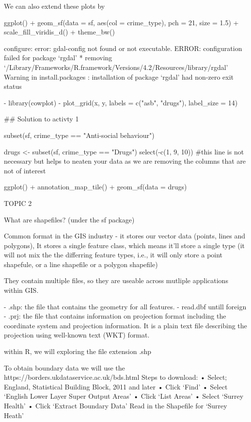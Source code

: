 \documentclass[12pt]{article}
\begin{document}
We can also extend these plots by 

ggplot() + 
  geom_sf(data = sf, aes(col = crime_type), pch = 21, size = 1.5) +
  scale_fill_viridis_d() + 
  theme_bw()


configure: error: gdal-config not found or not executable.
ERROR: configuration failed for package ‘rgdal’
* removing ‘/Library/Frameworks/R.framework/Versions/4.2/Resources/library/rgdal’
Warning in install.packages :
  installation of package ‘rgdal’ had non-zero exit status



- library(cowplot)
- plot_grid(x, y, labels = c("asb", "drugs"), label_size = 14)




## Solution to activty 1

subset(sf, crime_type == "Anti-social behaviour") 

drugs <- subset(sf, crime_type == "Drugs") %
  select(-c(1, 9, 10))      #this line is not necessary but helps to neaten your data as we are removing the columns that are not of interest

ggplot() +
  annotation_map_tile() +
  geom_sf(data = drugs) 





TOPIC 2 

  What are shapefiles?  (under the sf package)

Common format in the GIS industry - it stores our vector data (points, lines and polygons), It stores a single feature class, which means it'll store a single type (it will not mix the the differring feature types, i.e., it will only store a point shapefule, or a line shapefile or a polygon shapefile) 

They contain multiple files, so they are useable across mutliple applications within GIS.

- .shp: the file that contains the geometry for all features.
- read.dbf untill foreign
- .prj: the file that contains information on projection format including the coordinate system and projection information. It is a plain text file describing the projection using well-known text (WKT) format.


within R, we will exploring the file extension .shp 

To obtain boundary data we will use the https://borders.ukdataservice.ac.uk/bds.html
Steps to download:
•	Select; England, Statistical Building Block, 2011 and later
•	Click ‘Find’
•	Select ‘English Lower Layer Super Output Areas’
•	Click ‘List Areas’
•	Select ‘Surrey Health’
•	Click ‘Extract Boundary Data’
Read in the Shapefile for ‘Surrey Heath’
\end{document}
